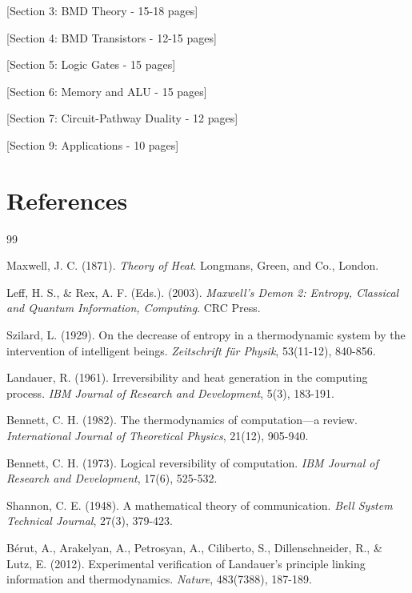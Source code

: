 \documentclass[11pt,a4paper]{article}
\begin{document}
[Section 3: BMD Theory - 15-18 pages]

[Section 4: BMD Transistors - 12-15 pages]

[Section 5: Logic Gates - 15 pages]

[Section 6: Memory and ALU - 15 pages]

[Section 7: Circuit-Pathway Duality - 12 pages]

[Section 9: Applications - 10 pages]

\clearpage

\section*{References}

\begin{thebibliography}{99}

Maxwell, J. C. (1871). \textit{Theory of Heat}. Longmans, Green, and Co., London.

Leff, H. S., \& Rex, A. F. (Eds.). (2003). \textit{Maxwell's Demon 2: Entropy, Classical and Quantum Information, Computing}. CRC Press.

Szilard, L. (1929). On the decrease of entropy in a thermodynamic system by the intervention of intelligent beings. \textit{Zeitschrift für Physik}, 53(11-12), 840-856.

Landauer, R. (1961). Irreversibility and heat generation in the computing process. \textit{IBM Journal of Research and Development}, 5(3), 183-191.

Bennett, C. H. (1982). The thermodynamics of computation—a review. \textit{International Journal of Theoretical Physics}, 21(12), 905-940.

Bennett, C. H. (1973). Logical reversibility of computation. \textit{IBM Journal of Research and Development}, 17(6), 525-532.

Shannon, C. E. (1948). A mathematical theory of communication. \textit{Bell System Technical Journal}, 27(3), 379-423.

Bérut, A., Arakelyan, A., Petrosyan, A., Ciliberto, S., Dillenschneider, R., \& Lutz, E. (2012). Experimental verification of Landauer's principle linking information and thermodynamics. \textit{Nature}, 483(7388), 187-189.


\end{thebibliography}
\end{document}
